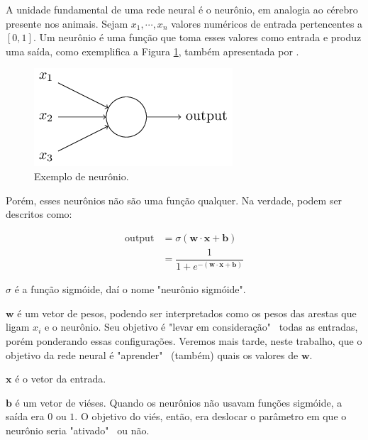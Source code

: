 \documentclass{article}
\begin{document}
            A unidade fundamental de uma rede neural é o neurônio, em analogia ao cérebro presente nos animais.
            Sejam $x_1, \cdots, x_n$ valores numéricos de entrada pertencentes a $[0, 1]$.
            Um neurônio é uma função que toma esses valores como entrada e produz uma saída, como exemplifica a Figura \ref{fig2}, também apresentada por \cite{nielsen2015neural}.

            \begin{figure}[h!]
                \centering
                \includegraphics[scale=0.5]{Images/Sigmoid neuron.png}
                \caption{Exemplo de neurônio.}
                \label{fig2}
            \end{figure}
            
            Porém, esses neurônios não são uma função qualquer. Na verdade, podem ser descritos como:

            \begin{equation}
                \begin{split}
                    \textrm{output} &= \sigma(\mathbf{w} \cdot \mathbf{x} + \mathbf{b}) \\
                                    &= \dfrac{1}{1 + e^{-(\mathbf{w} \cdot \mathbf{x} + \mathbf{b})}}
                \end{split}
            \end{equation}

            $\sigma$ é a função sigmóide, daí o nome "neurônio sigmóide".

            $\mathbf{w}$ é um vetor de pesos, podendo ser interpretados como os pesos das arestas que ligam $x_i$ e o neurônio.
            Seu objetivo é "levar em consideração" \ todas as entradas, porém ponderando essas configurações.
            Veremos mais tarde, neste trabalho, que o objetivo da rede neural é "aprender" \ (também) quais os valores de $\mathbf{w}$.

            $\mathbf{x}$ é o vetor da entrada.
            
            $\mathbf{b}$ é um vetor de viéses.
            Quando os neurônios não usavam funções sigmóide, a saída era $0$ ou $1$.
            O objetivo do viés, então, era deslocar o parâmetro em que o neurônio seria "ativado" \ ou não.
\end{document}
